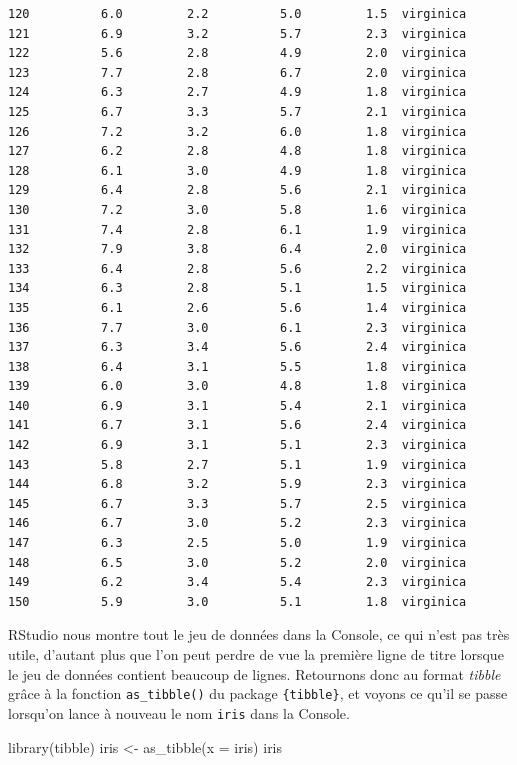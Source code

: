 \documentclass[
  letterpaper,
]{book}
\newenvironment{Shaded}{\begin{snugshade}}{\end{snugshade}}
\newcommand{\AttributeTok}[1]{\textcolor[rgb]{0.40,0.45,0.13}{#1}}
\newcommand{\FunctionTok}[1]{\textcolor[rgb]{0.28,0.35,0.67}{#1}}
\newcommand{\NormalTok}[1]{\textcolor[rgb]{0.00,0.23,0.31}{#1}}
\newcommand{\OtherTok}[1]{\textcolor[rgb]{0.00,0.23,0.31}{#1}}
\begin{document}
\begin{verbatim}
120          6.0         2.2          5.0         1.5  virginica
121          6.9         3.2          5.7         2.3  virginica
122          5.6         2.8          4.9         2.0  virginica
123          7.7         2.8          6.7         2.0  virginica
124          6.3         2.7          4.9         1.8  virginica
125          6.7         3.3          5.7         2.1  virginica
126          7.2         3.2          6.0         1.8  virginica
127          6.2         2.8          4.8         1.8  virginica
128          6.1         3.0          4.9         1.8  virginica
129          6.4         2.8          5.6         2.1  virginica
130          7.2         3.0          5.8         1.6  virginica
131          7.4         2.8          6.1         1.9  virginica
132          7.9         3.8          6.4         2.0  virginica
133          6.4         2.8          5.6         2.2  virginica
134          6.3         2.8          5.1         1.5  virginica
135          6.1         2.6          5.6         1.4  virginica
136          7.7         3.0          6.1         2.3  virginica
137          6.3         3.4          5.6         2.4  virginica
138          6.4         3.1          5.5         1.8  virginica
139          6.0         3.0          4.8         1.8  virginica
140          6.9         3.1          5.4         2.1  virginica
141          6.7         3.1          5.6         2.4  virginica
142          6.9         3.1          5.1         2.3  virginica
143          5.8         2.7          5.1         1.9  virginica
144          6.8         3.2          5.9         2.3  virginica
145          6.7         3.3          5.7         2.5  virginica
146          6.7         3.0          5.2         2.3  virginica
147          6.3         2.5          5.0         1.9  virginica
148          6.5         3.0          5.2         2.0  virginica
149          6.2         3.4          5.4         2.3  virginica
150          5.9         3.0          5.1         1.8  virginica
\end{verbatim}

RStudio nous montre tout le jeu de données dans la Console, ce qui n'est
pas très utile, d'autant plus que l'on peut perdre de vue la première
ligne de titre lorsque le jeu de données contient beaucoup de lignes.
Retournons donc au format \emph{tibble} grâce à la fonction
\texttt{as\_tibble()} du package \texttt{\{tibble\}}, et voyons ce qu'il
se passe lorsqu'on lance à nouveau le nom \texttt{iris} dans la Console.

\begin{Shaded}
\begin{Highlighting}[]
\FunctionTok{library}\NormalTok{(tibble)}
\NormalTok{iris }\OtherTok{\textless{}{-}} \FunctionTok{as\_tibble}\NormalTok{(}\AttributeTok{x =}\NormalTok{ iris)}
\NormalTok{iris}
\end{Highlighting}
\end{Shaded}
\end{document}
